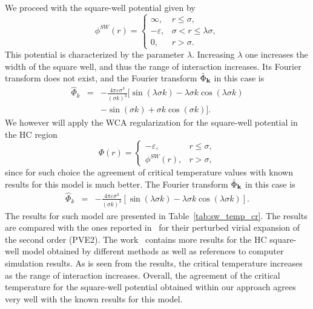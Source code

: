 We proceed with the square-well potential given by
\begin{equation*}
	\label{def:sw}
	\phi^{SW}(r) = \left\{
	\begin{array}{llll}
		\infty, & r\leq \sigma,
		\\
		-\varepsilon, & \sigma < r \leq \lambda\sigma,
		\\
		0, & r > \sigma.
	\end{array}
	\right.
\end{equation*}
This potential is characterized by the parameter $\lambda$. Increasing $\lambda$ one increases the width of the square well, and thus the range of interaction increases.
Its Fourier transform does not exist, and the Fourier transform $\hat{\Phi}_{\vb k}$ in this case is
\begin{eqnarray*}
	\hat{\Phi}_k & = & -\frac{4\pi\varepsilon\sigma^3}{(\sigma k)^3} 
	\bigl[\sin(\lambda \sigma k) - \lambda \sigma k \cos(\lambda \sigma k) 
	\\
	&& - \sin(\sigma k) + \sigma k \cos(\sigma k)\bigl].
\end{eqnarray*}
We however will apply the WCA regularization for the square-well potential
in the HC region
\begin{equation*}
	\label{def:sw-wca}
	\Phi(r) = \left\{
	\begin{array}{cc}
		-\varepsilon, & r \leq \sigma, 
		\\
		\phi^{SW}(r), & r > \sigma,
	\end{array}
	\right.
\end{equation*}
since for such choice the agreement of critical temperature values with known results for this model is much better. The Fourier transform $\hat{\Phi}_{\vb k}$ in this case is
\begin{eqnarray*}
	\hat{\Phi}_k & = & -\frac{4\pi\varepsilon\sigma^3}{(\sigma k)^3} 
	\left[\sin(\lambda \sigma k) - \lambda \sigma k \cos(\lambda \sigma k)\right].
\end{eqnarray*}
The results for such model are presented in Table~\ref{tab:sw_temp_cr}. The results are compared with the ones reported in~\cite{KreiciNezbeda2012} for their perturbed virial expansion of the second order (PVE2). The work~\cite{KreiciNezbeda2012} contains more results for the HC square-well model obtained by different methods as well as references to computer simulation results.  
As is seen from the results, the critical temperature increases as the range of interaction increases. Overall, the agreement of the critical temperature for the square-well potential obtained within our approach agrees very well with the known results for this model.

